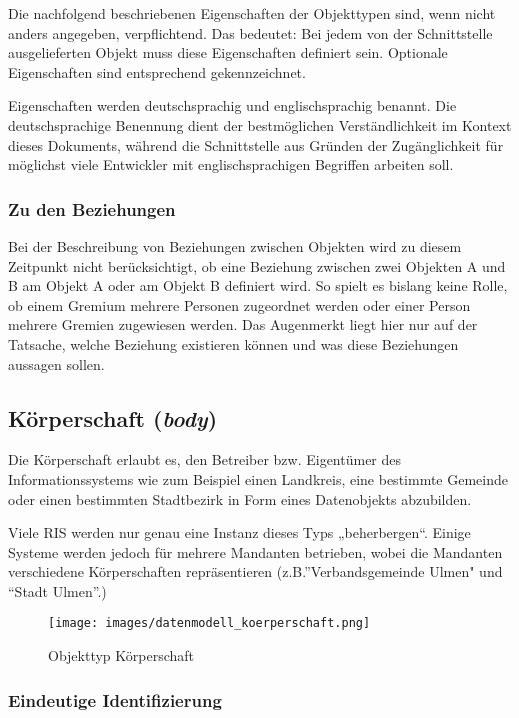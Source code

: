 \documentclass[,a4paper]{article}
\makeatletter
\def\maxwidth{\ifdim\Gin@nat@width>\linewidth\linewidth
\else\Gin@nat@width\fi}
\let\Oldincludegraphics\includegraphics
\renewcommand{\includegraphics}[1]{\Oldincludegraphics[width=\maxwidth]{#1}}
\makeatother
\begin{document}
Die nachfolgend beschriebenen Eigenschaften der Objekttypen sind, wenn
nicht anders angegeben, verpflichtend. Das bedeutet: Bei jedem von der
Schnittstelle ausgelieferten Objekt muss diese Eigenschaften definiert
sein. Optionale Eigenschaften sind entsprechend gekennzeichnet.

Eigenschaften werden deutschsprachig und englischsprachig benannt. Die
deutschsprachige Benennung dient der bestmöglichen Verständlichkeit im
Kontext dieses Dokuments, während die Schnittstelle aus Gründen der
Zugänglichkeit für möglichst viele Entwickler mit englischsprachigen
Begriffen arbeiten soll.

\subsubsection{Zu den Beziehungen}

Bei der Beschreibung von Beziehungen zwischen Objekten wird zu diesem
Zeitpunkt nicht berücksichtigt, ob eine Beziehung zwischen zwei Objekten
A und B am Objekt A oder am Objekt B definiert wird. So spielt es
bislang keine Rolle, ob einem Gremium mehrere Personen zugeordnet werden
oder einer Person mehrere Gremien zugewiesen werden. Das Augenmerkt
liegt hier nur auf der Tatsache, welche Beziehung existieren können und
was diese Beziehungen aussagen sollen.

\subsection{Körperschaft (\emph{body})}

Die Körperschaft erlaubt es, den Betreiber bzw. Eigentümer des
Informationssystems wie zum Beispiel einen Landkreis, eine bestimmte
Gemeinde oder einen bestimmten Stadtbezirk in Form eines Datenobjekts
abzubilden.

Viele RIS werden nur genau eine Instanz dieses Typs „beherbergen``.
Einige Systeme werden jedoch für mehrere Mandanten betrieben, wobei die
Mandanten verschiedene Körperschaften repräsentieren
(z.B.''Verbandsgemeinde Ulmen" und ``Stadt Ulmen''.)

\begin{figure}[htbp]
\centering
\texttt{[image: images/datenmodell\_koerperschaft.png]}
\caption{Objekttyp Körperschaft}
\end{figure}

\subsubsection{Eindeutige Identifizierung}
\end{document}

